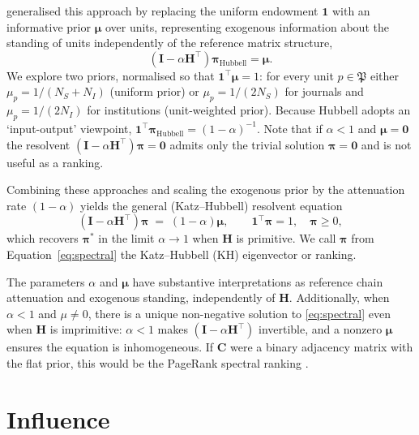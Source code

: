 \textcite{hubbellInputoutputApproachClique1965} generalised this approach by replacing
the uniform endowment $\mathbf{1}$ with an informative prior
$\boldsymbol{\mu}$ over units, representing exogenous information about
the standing of units independently of the reference matrix structure,
\[
	(\mathbf{I} - \alpha\mathbf{H}^\top)\boldsymbol{\pi}_\text{Hubbell} = \boldsymbol{\mu}.
\]
We explore two priors, normalised so that $\mathbf{1}^\top\boldsymbol{\mu}=1$:  for every unit $p\in\mathfrak{P}$ either $\mu_p = 1/(N_S+N_I)$ (uniform prior) or $\mu_p=1/(2N_S)$ for journals and $\mu_p=1/(2N_I)$ for institutions (unit-weighted prior). Because Hubbell adopts an `input-output' viewpoint, $\mathbf{1}^\top\boldsymbol{\pi}_{\text{Hubbell}} = (1-\alpha)^{-1}$. 
Note that if $\alpha < 1$ and $\boldsymbol{\mu}=\boldsymbol{0}$ the resolvent $(\mathbf{I}-\alpha\mathbf{H}^\top)\boldsymbol{\pi}=\mathbf{0}$ admits only the trivial solution $\boldsymbol{\pi}=\mathbf{0}$ and is not useful as a ranking.

Combining these approaches and scaling the exogenous prior by the attenuation rate $(1-\alpha)$ yields the general (Katz--Hubbell) resolvent equation
\begin{equation}
	(\mathbf{I} - \alpha\mathbf{H}^\top)\boldsymbol{\pi}
	\;=\;
	(1-\alpha)\boldsymbol{\mu},
	\qquad
	\mathbf{1}^\top\boldsymbol{\pi}=1,
	\quad
	\boldsymbol{\pi}\ge 0,
	\label{eq:spectral}
\end{equation}
which recovers $\boldsymbol{\pi}^*$ in the limit $\alpha\to 1$ when
$\mathbf{H}$ is primitive. We call $\boldsymbol{\pi}$ from Equation~\ref{eq:spectral} the Katz--Hubbell (KH) eigenvector or ranking.

The parameters $\alpha$ and $\boldsymbol{\mu}$ have substantive interpretations as reference chain attenuation and exogenous standing, independently of $\mathbf{H}$. Additionally, when $\alpha<1$ and $\mu \ne 0$, there is a unique non-negative solution to \eqref{eq:spectral} even when $\mathbf{H}$ is imprimitive: $\alpha<1$ makes $(\mathbf{I}-\alpha\mathbf{H}^\top)$ invertible, and a nonzero $\boldsymbol{\mu}$ ensures the equation is inhomogeneous. If $\mathbf{C}$ were a binary adjacency matrix with the flat prior, this would be the PageRank spectral ranking \citep{brinAnatomyLargescaleHypertextual1998}.

\section{Influence}
\label{sec:influence}


